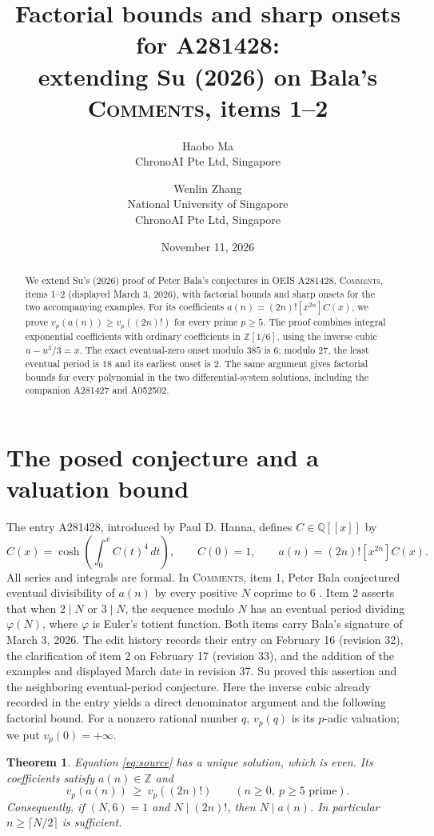 \documentclass[11pt]{article}
\title{Factorial bounds and sharp onsets for A281428:\\
extending Su (2026) on Bala's \textsc{Comments}, items 1--2}
\author{Haobo Ma\\\small ChronoAI Pte Ltd, Singapore
\and Wenlin Zhang\\\small National University of Singapore\\\small ChronoAI Pte Ltd, Singapore}
\date{November 11, 2026}
\newtheorem{theorem}{Theorem}
\newcommand{\Q}{\mathbb{Q}}
\newcommand{\Z}{\mathbb{Z}}
\newcommand{\coeff}[2]{[#1]#2}
\begin{document}
\maketitle
\begin{abstract}
We extend Su's (2026) proof of Peter Bala's conjectures in OEIS A281428,
\textsc{Comments}, items 1--2 (displayed March 3, 2026), with factorial bounds and
sharp onsets for the two accompanying examples.
For its coefficients $a(n)=(2n)!\coeff{x^{2n}}{C(x)}$, we prove
$v_p(a(n))\geq v_p((2n)!)$ for every prime $p\geq5$.
The proof combines integral exponential coefficients with ordinary coefficients
in $\Z[1/6]$, using the inverse cubic $u-u^3/3=x$.
The exact eventual-zero onset modulo $385$ is $6$; modulo $27$, the least
eventual period is $18$ and its earliest onset is $2$.
The same argument gives factorial bounds for every polynomial in the two
differential-system solutions, including the companion A281427 and A052502.
\end{abstract}

\section{The posed conjecture and a valuation bound}
The entry A281428, introduced by Paul D. Hanna, defines $C\in\Q[[x]]$ by
\begin{equation}\label{eq:source}
C(x)=\cosh\left(\int_0^x C(t)^4\,dt\right),\qquad
C(0)=1,\qquad a(n)=(2n)!\coeff{x^{2n}}{C(x)}.
\end{equation}
All series and integrals are formal. In \textsc{Comments}, item 1,
Peter Bala conjectured eventual divisibility of $a(n)$ by every positive $N$
coprime to $6$ \cite{oeis}. Item 2 asserts that when $2\mid N$ or $3\mid N$,
the sequence modulo $N$ has an eventual period dividing $\varphi(N)$,
where $\varphi$ is Euler's totient function.
Both items carry Bala's signature of March 3, 2026.
The edit history records their entry on February 16 (revision 32),
the clarification of item 2 on February 17 (revision 33), and the addition
of the examples and displayed March date in revision 37.
Su \cite[Theorem 4.1, pp.~7--8]{su} proved
this assertion and the neighboring eventual-period conjecture.
Here the inverse cubic already recorded in the entry yields a direct
denominator argument and the following factorial bound.
For a nonzero rational number $q$, $v_p(q)$ is its $p$-adic valuation;
we put $v_p(0)=+\infty$.

\begin{theorem}\label{thm:main}
Equation \eqref{eq:source} has a unique solution, which is even.
Its coefficients satisfy $a(n)\in\Z$ and
\begin{equation}\label{eq:valuation}
v_p(a(n))\ \geq\ v_p((2n)!)\qquad(n\geq0,\ p\geq5\text{ prime}).
\end{equation}
Consequently, if $(N,6)=1$ and $N\mid(2n)!$, then $N\mid a(n)$.
In particular $n\geq\lceil N/2\rceil$ is sufficient.
\end{theorem}
\end{document}
